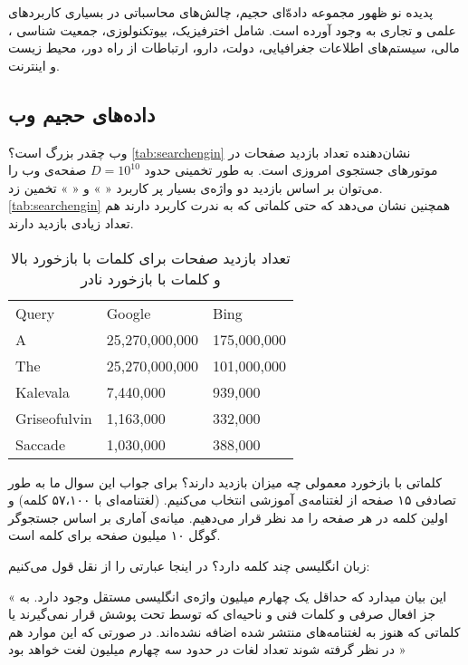 پدیده نو ظهور مجموعه‌ داده‌ّای حجیم، چالش‌های محاسباتی در بسیاری کاربردهای علمی و تجاری به وجود آورده است. شامل اخترفیزیک، بیوتکنولوزی، جمعیت شناسی
، مالی، سیستم‌های اطلاعات جغرافیایی، دولت، دارو، ارتباطات از راه دور، محیط زیست و اینترنت.

\subsection{داده‌های حجیم وب}

وب چقدر بزرگ است؟  
\autoref{tab:searchengin}
نشان‌دهنده تعداد بازدید صفحات در موتورهای جستجوی امروزی است. به طور تخمینی حدود 
$D = 10^10$
صفحه‌ی وب را می‌توان بر اساس بازدید دو واژه‌ی بسیار پر کاربرد «
» و «
» تخمین زد. 
\autoref{tab:searchengin}
 همچنین نشان می‌دهد که حتی کلماتی که به ندرت کاربرد دارند هم تعداد زیادی بازدید دارند.

\begin{table}[h]
\centering
\begin{latin}
\begin{tabular}{lll}
\hline
Query        & Google         & Bing        \\ \hhline{===}
A            & 25,270,000,000 & 175,000,000 \\
The          & 25,270,000,000 & 101,000,000 \\
Kalevala     & 7,440,000      & 939,000     \\
Griseofulvin & 1,163,000      & 332,000     \\
Saccade      & 1,030,000      & 388,000     \\
\hline
\end{tabular}
\end{latin}
\caption{
تعداد بازدید صفحات برای کلمات با بازخورد بالا و کلمات با بازخورد نادر
}
\label{tab:searchengin}
\end{table}


کلماتی با بازخورد معمولی چه میزان بازدید دارند؟ برای جواب این سوال ما به طور تصادفی ۱۵ صفحه از لغتنامه‌‌ی آموزشی انتخاب می‌کنیم.
\cite{litez94}
(لغتنامه‌ای با ۵۷،۱۰۰ کلمه) و اولین کلمه در هر صفحه را مد نظر قرار می‌دهیم. میانه‌ی آماری بر اساس جستجو‌گر گوگل ۱۰ میلیون صفحه برای کلمه است.

زبان انگلیسی چند کلمه دارد؟ در اینجا عبارتی را از 
نقل قول می‌کنیم:

« این بیان میدارد که حداقل یک چهارم میلیون واژه‌ی انگلیسی مستقل وجود دارد. به جز افعال صرفی و کلمات فنی و ناحیه‌ای که توسط 
تحت پوشش قرار نمی‌گیرند یا کلماتی که هنوز به لغتنامه‌های منتشر شده اضافه نشده‌اند. در صورتی که این موارد هم در نظر گرفته شوند تعداد لغات در حدود سه چهارم میلیون لغت خواهد بود »

